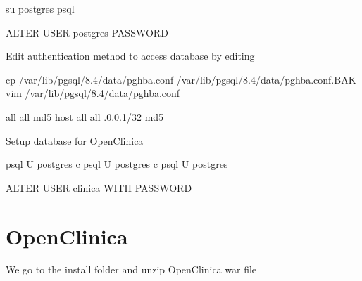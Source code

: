 \documentclass[letterpaper,10pt,english]{sphinxmanual}
\begin{document}
%
\begin{sphinxVerbatim}[commandchars=\\\{\}]
su postgres
psql

ALTER USER postgres PASSWORD 

\end{sphinxVerbatim}

Edit authentication method to access database by editing 

%
\begin{sphinxVerbatim}[commandchars=\\\{\}]
cp /var/lib/pgsql/8.4/data/pg\PYGZus{}hba.conf /var/lib/pgsql/8.4/data/pg\PYGZus{}hba.conf.BAK
vim /var/lib/pgsql/8.4/data/pg\PYGZus{}hba.conf
\end{sphinxVerbatim}

%
\begin{sphinxVerbatim}[commandchars=\\\{\}]
   all             all                                     md5
host    all             all             .0.0.1/32            md5
\end{sphinxVerbatim}

Setup database for OpenClinica

%
\begin{sphinxVerbatim}[commandchars=\\\{\}]
psql \PYGZhy{}U postgres \PYGZhy{}c 
psql \PYGZhy{}U postgres \PYGZhy{}c 
psql \PYGZhy{}U postgres

ALTER USER clinica WITH PASSWORD 
\end{sphinxVerbatim}


\section{OpenClinica}
\label{\detokenize{trl1:id1}}
We go to the install folder and unzip OpenClinica war file
\end{document}
